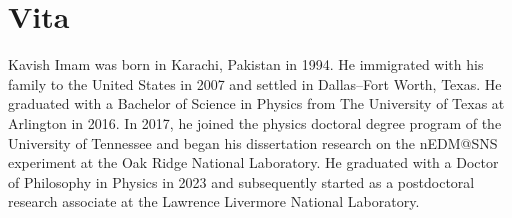 \chapter*{Vita} \label{ch:vita}
Kavish Imam was born in Karachi, Pakistan in 1994. He immigrated with his family to the United States in 2007 and settled in Dallas–Fort Worth, Texas. He graduated with a Bachelor of Science in Physics from The University of Texas at Arlington in 2016. In 2017, he joined the physics doctoral degree program of the University of Tennessee and began his dissertation research on the nEDM@SNS experiment at the Oak Ridge National Laboratory. He graduated with a Doctor of Philosophy in Physics in 2023 and subsequently started as a postdoctoral research associate at the Lawrence Livermore National Laboratory.